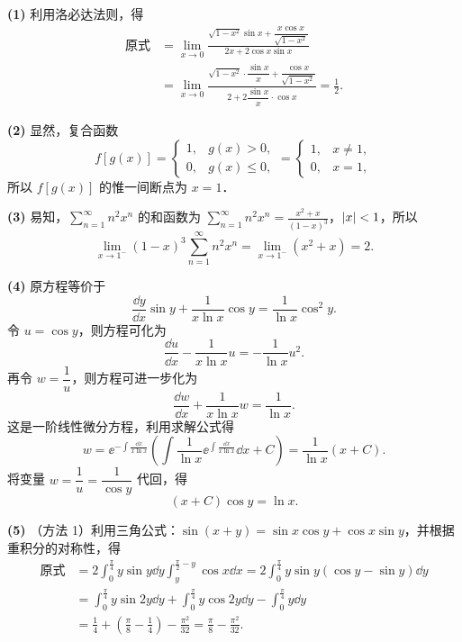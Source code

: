 \begin{solution}
\textbf{(1)} 利用洛必达法则，得
\begin{align*}
\text{原式}&=\lim_{x\to0}\frac{\sqrt{1-x^2}\sin x+\dfrac{x\cos x}{\sqrt{1-x^2}}}{2x+2\cos x\sin x}\\
&=\lim_{x\to0}\frac{\sqrt{1-x^2}\cdot\dfrac{\sin x}{x}+\dfrac{\cos x}{\sqrt{1-x^2}}}{2+2\dfrac{\sin x}{x}\cdot\cos x}=\frac12.
\end{align*}

\textbf{(2)} 显然，复合函数
\[
f[g(x)]=\begin{cases}1,&g(x)>0,\\0,&g(x)\le0,\end{cases}
=\begin{cases}1,&x\ne1,\\0,&x=1,\end{cases}
\]
所以 $f[g(x)]$ 的惟一间断点为 $x=1$．

\textbf{(3)} 易知，$\displaystyle \sum_{n=1}^{\infty}n^2x^n$ 的和函数为 $\displaystyle \sum_{n=1}^{\infty}n^2x^n=\frac{x^2+x}{(1-x)^3}$，$\left|x\right|<1$，所以
\[
\lim_{x\to1^-}(1-x)^3\sum_{n=1}^{\infty}n^2x^n=\lim_{x\to1^-}(x^2+x)=2.
\]

\textbf{(4)} 原方程等价于
\[
\frac{\dd y}{\dd x}\sin y+\frac{1}{x\ln x}\cos y=\frac{1}{\ln x}\cos^2y.
\]
令 $u=\cos y$，则方程可化为
\[
\frac{\dd u}{\dd x}-\frac{1}{x\ln x}u=-\frac{1}{\ln x}u^2.
\]
再令 $w=\dfrac1u$，则方程可进一步化为
\[
\frac{\dd w}{\dd x}+\frac{1}{x\ln x}w=\frac{1}{\ln x}.
\]
这是一阶线性微分方程，利用求解公式得
\[
w=\ee^{-\int\frac{\dd x}{x\ln x}}\left(\int\frac{1}{\ln x}\ee^{\int\frac{\dd x}{x\ln x}}\dd x+C\right)=\frac{1}{\ln x}(x+C).
\]
将变量 $w=\dfrac1u=\dfrac{1}{\cos y}$ 代回，得
\[
(x+C)\cos y=\ln x.
\]

\textbf{(5)} （方法 1）利用三角公式：$\sin(x+y)=\sin x\cos y+\cos x\sin y$，并根据重积分的对称性，得
\begin{align*}
\text{原式}&=2\int_0^{\frac{\pi}{4}}y\sin y\dd y\int_y^{\frac{\pi}{2}-y}\cos x\dd x
=2\int_0^{\frac{\pi}{4}}y\sin y(\cos y-\sin y)\dd y\\
&=\int_0^{\frac{\pi}{4}}y\sin2y\dd y+\int_0^{\frac{\pi}{4}}y\cos2y\dd y-\int_0^{\frac{\pi}{4}}y\dd y\\
&=\frac14+\left(\frac{\pi}{8}-\frac14\right)-\frac{\pi^2}{32}=\frac{\pi}{8}-\frac{\pi^2}{32}.
\end{align*}


\end{solution}
